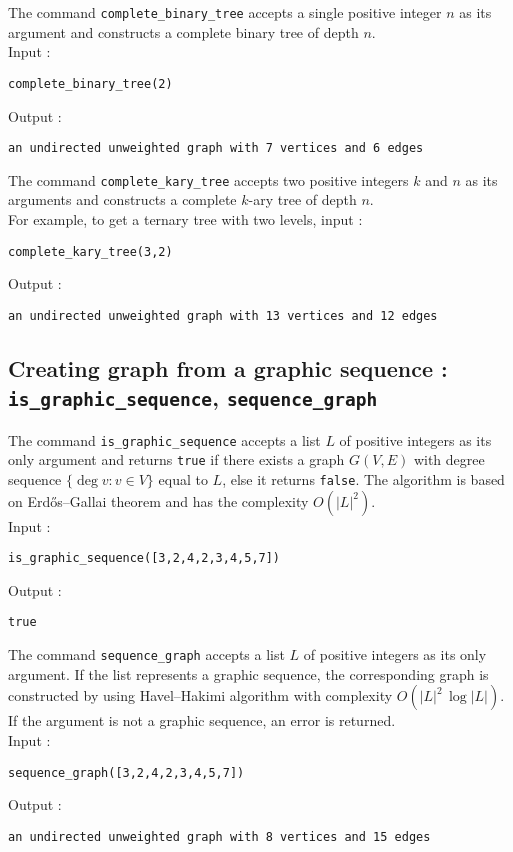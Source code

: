 \documentclass[a4paper,11pt]{article}
\begin{document}
The command {\tt complete\_binary\_tree} accepts a single positive integer $ n $ as its argument and constructs a complete binary tree of depth $ n $.\\
Input :
\begin{center}
  \tt complete\_binary\_tree(2)
\end{center}
Output :
\begin{center}
  \tt an undirected unweighted graph with 7 vertices and 6 edges
\end{center}

The command {\tt complete\_kary\_tree} accepts two positive integers $ k $ and $ n $ as its arguments and constructs a complete $ k $-ary tree of depth $ n $.\\
For example, to get a ternary tree with two levels, input :
\begin{center}
  \tt complete\_kary\_tree(3,2)
\end{center}
Output :
\begin{center}
  \tt an undirected unweighted graph with 13 vertices and 12 edges
\end{center}

\subsection{Creating graph from a graphic sequence : {\tt is\_graphic\_sequence}, {\tt sequence\_graph}}

The command {\tt is\_graphic\_sequence} accepts a list $ L $ of positive integers as its only argument and returns {\tt true} if there exists a graph $ G(V,E) $ with degree sequence $ \{\deg v:v\in V\} $ equal to $ L $, else it returns {\tt false}. The algorithm is based on Erdős--Gallai theorem and has the complexity $ O(|L|^2) $.\\ 
Input :
\begin{center}
   \tt is\_graphic\_sequence([3,2,4,2,3,4,5,7])
\end{center}
Output :
\begin{center}
  \tt true
\end{center}

The command {\tt sequence\_graph} accepts a list $ L $ of positive integers as its only argument. If the list represents a graphic sequence, the corresponding graph is constructed by using Havel--Hakimi algorithm with complexity $ O(|L|^2\,\log |L|) $. If the argument is not a graphic sequence, an error is returned.\\
Input :
\begin{center}
  \tt sequence\_graph([3,2,4,2,3,4,5,7])
\end{center}
Output :
\begin{center}
  \tt an undirected unweighted graph with 8 vertices and 15 edges
\end{center}
\end{document}
